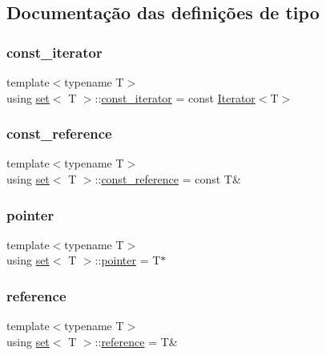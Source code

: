 \subsection{Documentação das definições de tipo}
\mbox{\label{classset_a1a9f610c8f0dd1d2ca1af0f435e45067}} 
\subsubsection{\texorpdfstring{const\+\_\+iterator}{const\_iterator}}
{\footnotesize\ttfamily template$<$typename T$>$ \\
using \hyperlink{classset}{set}$<$ T $>$\+::\hyperlink{classset_a1a9f610c8f0dd1d2ca1af0f435e45067}{const\+\_\+iterator} =  const \hyperlink{classIterator}{Iterator}$<$T$>$}

\mbox{\label{classset_aaafc18d8ba5261e496a013e32b9dbe28}} 
\subsubsection{\texorpdfstring{const\+\_\+reference}{const\_reference}}
{\footnotesize\ttfamily template$<$typename T$>$ \\
using \hyperlink{classset}{set}$<$ T $>$\+::\hyperlink{classset_aaafc18d8ba5261e496a013e32b9dbe28}{const\+\_\+reference} =  const T\&}

\mbox{\label{classset_ad32f9470f9e3b712862cef35b28ac0a3}} 
\subsubsection{\texorpdfstring{pointer}{pointer}}
{\footnotesize\ttfamily template$<$typename T$>$ \\
using \hyperlink{classset}{set}$<$ T $>$\+::\hyperlink{classset_ad32f9470f9e3b712862cef35b28ac0a3}{pointer} =  T$\ast$}

\mbox{\label{classset_a67b599d0cfab79343858fd88906b7f27}} 
\subsubsection{\texorpdfstring{reference}{reference}}
{\footnotesize\ttfamily template$<$typename T$>$ \\
using \hyperlink{classset}{set}$<$ T $>$\+::\hyperlink{classset_a67b599d0cfab79343858fd88906b7f27}{reference} =  T\&}


